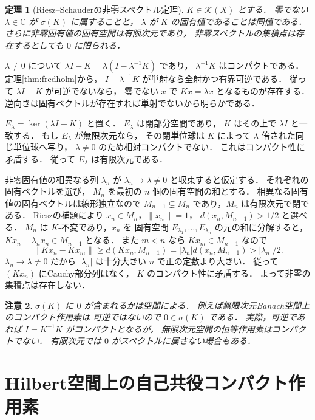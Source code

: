 \documentclass[a5paper,10pt,onecolumn]{jsarticle}
\makeatletter
\theoremstyle{mathnotetheorem}
\newtheorem{theorem}{定理}[section]
\newtheorem{remark}[theorem]{注意}
\renewcommand{\proofname}{証明}
\renewenvironment{proof}[1][\proofname]{%
  \par\pushQED{\qed}\normalfont\topsep4\p@\@plus2\p@\relax
  \trivlist\item[\hskip\labelsep\bfseries #1]\ignorespaces
}{\popQED\endtrivlist\@endpefalse}
\newcommand{\norm}[1]{\lVert #1\rVert}
\makeatother
\begin{document}
\begin{theorem}[Riesz--Schauderの非零スペクトル定理]
\label{thm:riesz-schauder}
$K\in\mathcal K(X)$ とする．
零でない $\lambda\in\mathbb C$ が $\sigma(K)$ に属することと，
$\lambda$ が $K$ の固有値であることは同値である．
さらに非零固有値の固有空間は有限次元であり，
非零スペクトルの集積点は存在するとしても $0$ に限られる．
\end{theorem}
\begin{proof}
$\lambda\ne0$ について
$\lambda I-K=\lambda(I-\lambda^{-1}K)$ であり，
$\lambda^{-1}K$ はコンパクトである．
定理\ref{thm:fredholm}から，
$I-\lambda^{-1}K$ が単射なら全射かつ有界可逆である．
従って $\lambda I-K$ が可逆でないなら，
零でない $x$ で $Kx=\lambda x$ となるものが存在する．
逆向きは固有ベクトルが存在すれば単射でないから明らかである．

$E_\lambda=\ker(\lambda I-K)$ と置く．
$E_\lambda$ は閉部分空間であり，
$K$ はその上で $\lambda I$ と一致する．
もし $E_\lambda$ が無限次元なら，
その閉単位球は $K$ によって
$\lambda$ 倍された同じ単位球へ写り，
$\lambda\ne0$ のため相対コンパクトでない．
これはコンパクト性に矛盾する．
従って $E_\lambda$ は有限次元である．

非零固有値の相異なる列 $\lambda_n$ が
$\lambda_n\to\lambda\ne0$ と収束すると仮定する．
それぞれの固有ベクトルを選び，
$M_n$ を最初の $n$ 個の固有空間の和とする．
相異なる固有値の固有ベクトルは線形独立なので
$M_{n-1}\subsetneq M_n$ であり，$M_n$ は有限次元で閉である．
Rieszの補題により
$x_n\in M_n$，$\norm{x_n}=1$，
$d(x_n,M_{n-1})>1/2$ と選べる．
$M_n$ は $K$-不変であり，$x_n$ を
固有空間 $E_{\lambda_1},\ldots,E_{\lambda_n}$ の元の和に分解すると，
$Kx_n-\lambda_nx_n\in M_{n-1}$ となる．
また $m<n$ なら $Kx_m\in M_{n-1}$ なので
\[
 \norm{Kx_n-Kx_m}
 \ge d(Kx_n,M_{n-1})
 =|\lambda_n|d(x_n,M_{n-1})
 >|\lambda_n|/2.
\]
$\lambda_n\to\lambda\ne0$ だから
$|\lambda_n|$ は十分大きい $n$ で正の定数より大きい．
従って $(Kx_n)$ にCauchy部分列はなく，
$K$ のコンパクト性に矛盾する．
よって非零の集積点は存在しない．
\end{proof}

\begin{remark}
$\sigma(K)$ に $0$ が含まれるかは空間による．
例えば無限次元Banach空間上のコンパクト作用素は
可逆ではないので $0\in\sigma(K)$ である．
実際，可逆であれば $I=K^{-1}K$ がコンパクトとなるが，
無限次元空間の恒等作用素はコンパクトでない．
有限次元では $0$ がスペクトルに属さない場合もある．
\end{remark}

\section{Hilbert空間上の自己共役コンパクト作用素}
\end{document}
